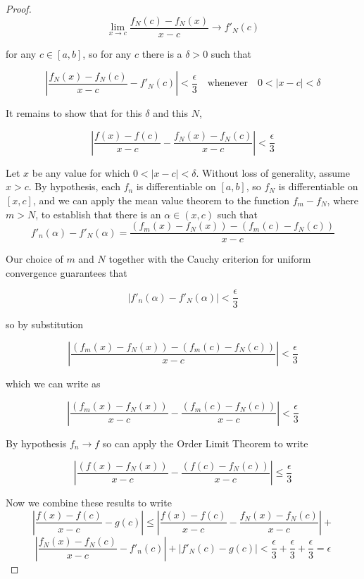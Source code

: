 \begin{proof}
\[
\lim_{x\rightarrow c}\frac{f_N(c)-f_N(x)}{x-c} \rightarrow f'_N(c)
\]
\par\vspace{0.5 cm}
for any $c\in[a,b]$, so for any $c$ there is a $\delta>0$ such that 
\par\vspace{0.5 cm}
\[
\left|\frac{f_N(x)-f_N(c)}{x-c} - f'_N(c)\right| < \frac{\epsilon}{3}\quad\mbox{whenever}\quad 0 < |x-c| < \delta
\]
\par\vspace{0.5 cm}
It remains to show that for this $\delta$ and this $N$,
\par\vspace{0.5 cm} 
\[
\left|\frac{f(x)-f(c)}{x-c} - \frac{f_N(x)-f_N(c)}{x-c} \right| < \frac{\epsilon}{3}
\]
\par\vspace{0.5 cm}
Let $x$ be any value for which $0 < |x-c| < \delta$.  Without loss of generality, assume $x>c$. By hypothesis, each $f_n$ is differentiable on $[a,b]$, so $f_N$ is differentiable on $[x,c]$, and we can apply the mean value theorem to the function $f_m-f_N$, where $m>N$, to establish that there is an $\alpha\in(x,c)$ such that
\[
f'_n(\alpha)-f'_N(\alpha) = \frac{(f_m(x)-f_N(x))-(f_m(c)-f_N(c))}{x-c}
\]
\par\vspace{0.5 cm}
Our choice of $m$ and $N$ together with the Cauchy criterion for uniform convergence guarantees that
\par\vspace{0.5 cm}
\[
\left|f'_n(\alpha)-f'_N(\alpha)\right| < \frac{\epsilon}{3}
\]
\par\vspace{0.5 cm}
so by substitution
\par\vspace{0.5 cm}
\[
\left|\frac{(f_m(x)-f_N(x))-(f_m(c)-f_N(c))}{x-c}\right| < \frac{\epsilon}{3}
\]
\par\vspace{0.5 cm}
which we can write as
\par\vspace{0.5 cm}
\[
\left|\frac{(f_m(x)-f_N(x))}{x-c}-\frac{(f_m(c)-f_N(c))}{x-c}\right| < \frac{\epsilon}{3}
\]
\par\vspace{0.5 cm}
By hypothesis $f_n\rightarrow f$ so can apply the Order Limit Theorem to write 
\par\vspace{0.5 cm}
\[
\left|\frac{(f(x)-f_N(x))}{x-c}-\frac{(f(c)-f_N(c))}{x-c}\right| \leq \frac{\epsilon}{3}
\]
\par\vspace{0.5 cm}
Now we combine these results to write
\[
\left|\frac{f(x)-f(c)}{x-c} - g(c)\right| \leq \left|\frac{f(x)-f(c)}{x-c} - \frac{f_N(x)-f_N(c)}{x-c} \right| +
\]
\[
\left|\frac{f_N(x)-f_N(c)}{x-c} - f'_n(c) \right| + \left|f'_N(c) - g(c)\right| < \frac{\epsilon}{3}+\frac{\epsilon}{3}+\frac{\epsilon}{3} = \epsilon
\]
\end{proof}
